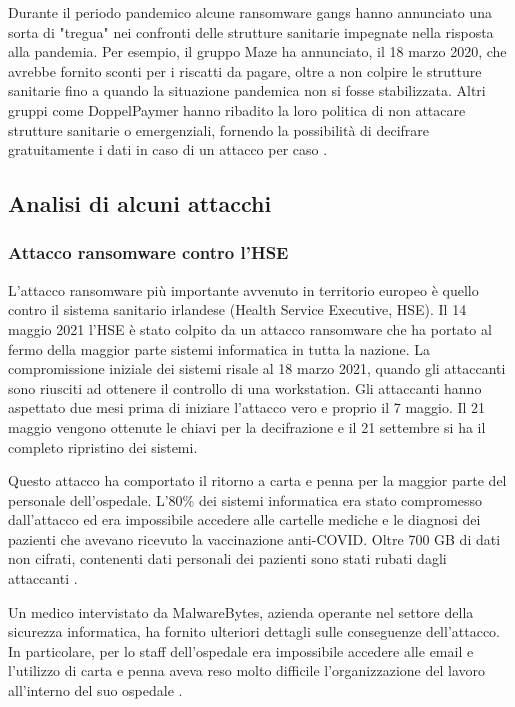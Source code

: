 \documentclass[12pt]{article}
\begin{document}
Durante il periodo pandemico alcune ransomware gangs hanno annunciato una sorta di "tregua" nei confronti delle strutture sanitarie impegnate nella risposta alla pandemia. Per esempio, il gruppo Maze ha annunciato, il 18 marzo 2020, che avrebbe fornito sconti per i riscatti da pagare, oltre a non colpire le strutture sanitarie fino a quando la situazione pandemica non si fosse stabilizzata. Altri gruppi come DoppelPaymer hanno ribadito la loro politica di non attacare strutture sanitarie o emergenziali, fornendo la possibilità di decifrare gratuitamente i dati in caso di un attacco per caso \cite{noauthor_ransomware_2022-2} \cite{noauthor_top_2022} \cite{noauthor_lockbit_2022}.

\subsection{Analisi di alcuni attacchi}

\subsubsection{Attacco ransomware contro l'HSE}

L’attacco ransomware più importante avvenuto in territorio europeo è quello contro il sistema sanitario irlandese (Health Service Executive, HSE). Il 14 maggio 2021 l'HSE è stato colpito da un attacco ransomware che ha portato al fermo della maggior parte sistemi informatica in tutta la nazione. La compromissione iniziale dei sistemi risale al 18 marzo 2021, quando gli attaccanti sono riusciti ad ottenere il controllo di una workstation. Gli attaccanti hanno aspettato due mesi prima di iniziare l'attacco vero e proprio il 7 maggio.
Il 21 maggio vengono ottenute le chiavi per la decifrazione e il 21 settembre si ha il completo ripristino dei sistemi.

Questo attacco ha comportato il ritorno a carta e penna per la maggior parte del personale dell'ospedale. L'80\% dei sistemi informatica era stato compromesso dall'attacco ed era impossibile accedere alle cartelle mediche e le diagnosi dei pazienti che avevano ricevuto la vaccinazione anti-COVID. Oltre 700 GB di dati non cifrati, contenenti dati personali dei pazienti sono stati rubati dagli attaccanti \cite{attaway_case_2022}.

Un medico intervistato da MalwareBytes, azienda operante nel settore della sicurezza informatica, ha fornito ulteriori dettagli sulle conseguenze dell'attacco. In particolare, per lo staff dell'ospedale era impossibile accedere alle email e l'utilizzo di carta e penna aveva reso molto difficile l'organizzazione del lavoro all'interno del suo ospedale \cite{noauthor_doctor_2022}.
\end{document}
